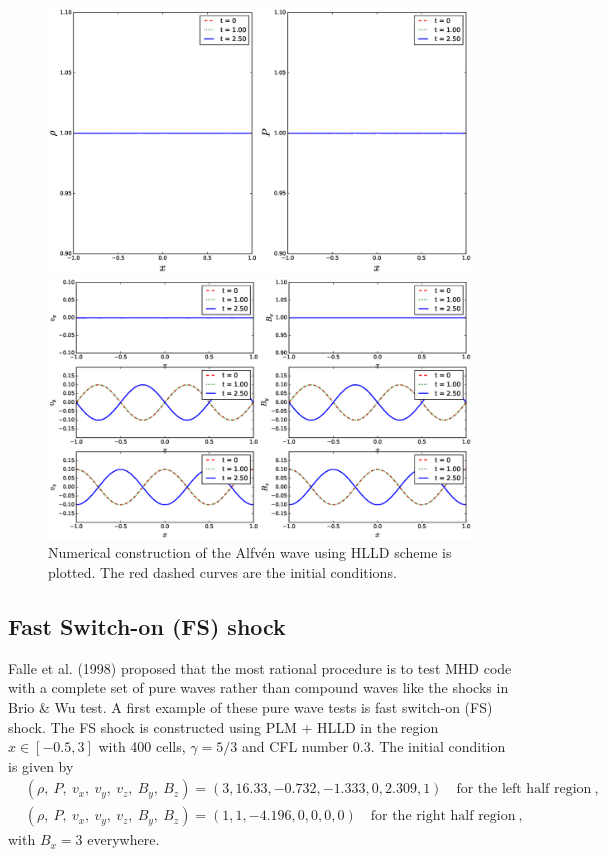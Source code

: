 \documentclass[10.5pt]{article}
\begin{document}
\begin{figure}[ht]
	\centering
	\begin{minipage}[c]{0.9\textwidth}
		\includegraphics[width=1\textwidth]{AW1.eps}
	\end{minipage}
	\begin{minipage}[c]{0.9\textwidth}
		\includegraphics[width=1\textwidth]{AW2.eps}
	\end{minipage}%
\caption{Numerical construction of the Alfv\'en wave using HLLD 
scheme is plotted. The red dashed curves are the initial conditions.}
\label{fig: AW}
\end{figure}

\clearpage

\subsection{Fast Switch-on (FS) shock}
Falle et al. (1998) \cite{falle1998} proposed that the most rational procedure is to test MHD 
code with a complete set of pure waves rather than compound waves like the shocks in 
Brio \& Wu test.
A first example of these pure wave tests is fast switch-on (FS) shock. The FS shock is 
constructed using PLM + HLLD in the region $x\in[-0.5,3]$ with 400 cells, $\gamma=5/3$ and CFL number 0.3. 
The initial condition is given by 
\begin{align}
	&(\rho,\ P,\ v_x,\ v_y,\ v_z,\ B_y,\ B_z) = (3, 16.33, -0.732, -1.333, 0, 2.309, 1) \quad
	\text{for the left half region}  \ , \\
	&(\rho,\ P,\ v_x,\ v_y,\ v_z,\ B_y,\ B_z) = (1,1,-4.196,0,0,0,0) \quad
	\text{for the right half region}  \ , 
\end{align}
with $B_x = 3$ everywhere. 
\end{document}
